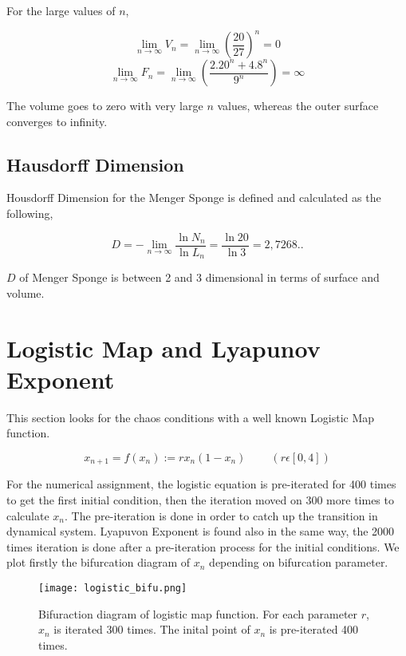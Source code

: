 \documentclass[12pt]{article}
\begin{document}
For the large values of $n$,

\begin{equation*}
\lim_{n \to \infty} V_n = \lim_{n \to \infty} \left( \frac{20}{27}\right)^n =0  
\end{equation*}
\begin{equation*}
\lim_{n \to \infty} F_n = \lim_{n \to \infty} \left(\frac{2.20^n+4.8^n}{9^n}\right) = \infty  
\end{equation*}

The volume goes to zero with very large $n$ values, whereas the outer surface converges to infinity.
   
\subsection{Hausdorff Dimension}   
   
Housdorff Dimension for the Menger Sponge is defined and calculated as the following,

\begin{equation*}
D = - \lim_{n \to \infty} \frac{\ln{N_n} }{\ln{L_n}} = \frac{\ln{20}}{\ln{3}} = 2,7268..
\end{equation*}   

$D$ of Menger Sponge is between 2 and 3 dimensional in terms of surface and volume.   

\section{Logistic Map and Lyapunov Exponent}

This section looks for the chaos conditions with a well known Logistic Map function.

\begin{equation}
x_{n+1}=f(x_n):= rx_n(1-x_n) \;\;\;\;\;\;\;\; (r \epsilon [0,4])
\end{equation}

For the numerical assignment, the logistic equation is pre-iterated for 400 times to get the first initial condition, then the iteration moved on 300 more times to calculate $x_n$.  The pre-iteration is done in order to catch up the transition in dynamical system. Lyapuvon Exponent is found also in the same way, the 2000 times iteration is done after a pre-iteration process for the initial conditions. We plot firstly the bifurcation diagram of $x_n$ depending on bifurcation parameter. 


 \begin{figure}[h!]
	\centering
	\texttt{[image: logistic\_bifu.png]}
		\caption{Bifuraction diagram of logistic map function. For each parameter $r$, $x_n$ is iterated 300 times. The inital point of $x_n$ is pre-iterated 400 times. }
\end{figure}  
   
\end{document}
